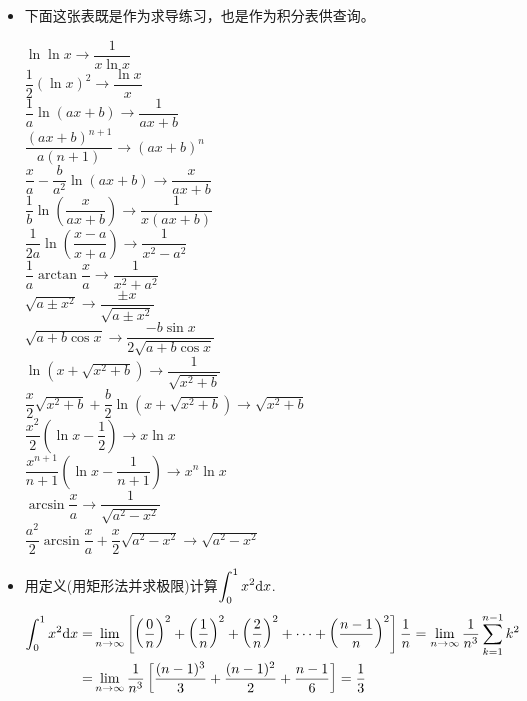 \begin{itemize}[leftmargin=\inteval{\myitemleftmargin}pt,itemsep=
   \inteval{\myitemitempsep}pt,topsep=\inteval{\myitemtopsep}pt]
\item 下面这张表既是作为求导练习，也是作为积分表供查询。
\vspace{-3mm}
\begin{multicols}{2}
\noindent $ \ln\ln x \to \dfrac{1}{x\ln x} $ \\ 
$ \dfrac{1}{2}(\ln x)^2\to \dfrac{\ln x}{x} $ \\
$ \dfrac{1}{a}\ln(ax+b)\to \dfrac{1}{ax+b} $ \\ 
$ \dfrac{(ax+b)^{n+1}}{a(n+1)} \to (ax+b)^n $ \\ 
$ \dfrac{x}{a}-\dfrac{b}{a^2}\ln(ax+b) \to \dfrac{x}{ax+b}  $ \\ 
$ \dfrac{1}{b}\ln \left( \dfrac{x}{ax+b}\right) \to \dfrac{1}{x(ax+b)}   $ \\ 
$ \dfrac{1}{2a}\ln \left(\dfrac{x-a}{x+a} \right)\to\dfrac{1}{x^2-a^2} $ \\ 
$ \dfrac{1}{a}\arctan\dfrac{x}{a}\to\dfrac{1}{x^2+a^2} $ \\ 
$ \sqrt{a\pm x^2} \to \dfrac{\pm x}{\sqrt{a\pm x^2}} $ \\ 
$ \sqrt{a+b\cos x}\to \dfrac{-b\sin x}{2\sqrt{a+b\cos x}} $ \\ 
$ \ln(x+\sqrt{x^2+b}) \to \dfrac{1}{\sqrt{x^2+b}}   $ \\ 
$ \dfrac{x}{2}\sqrt{x^2+b}+\dfrac{b}{2}\ln(x+\sqrt{x^2+b})\to\sqrt{x^2+b} $\\ 
$ \dfrac{x^2}{2}\left(\ln x-\dfrac{1}{2} \right) \to x\ln x $ \\ 
$ \dfrac{x^{n+1}}{n+1}\left(\ln x-\dfrac{1}{n+1} \right) \to x^n\ln x $ \\ 
$ \arcsin \dfrac{x}{a} \to \dfrac{1}{\sqrt{a^2-x^2}}  $ \\ 
$ \dfrac{a^2}{2}\arcsin\dfrac{x}{a}+\dfrac{x}{2}\sqrt{a^2-x^2} \to \sqrt{a^2-x^2} $    
\end{multicols}

\item 用定义(用矩形法并求极限)计算$ \displaystyle\int_{0}^{1}x^2\mathrm{d} x $.
\begin{align*}
    \int_{0}^{1}x^2\mathrm{d} x=&\lim_{n\to \infty}\left[\left(\dfrac{0}{n}\right)^2+
    \left(\dfrac{1}{n}\right)^2+\left(\dfrac{2}{n}\right)^2+
    \cdots+\left(\dfrac{n-1}{n}\right)^2\right]\dfrac{1}{n} 
    =\lim_{n\to \infty}\dfrac{1}{n^3}\sum_{k=1}^{n-1}k^2 \\
    =&\lim_{n\to \infty}\dfrac{1}{n^3}\left[ \dfrac{(n-1)^3}{3}+\dfrac{(n-1)^2}{2}
    +\dfrac{n-1}{6}\right] = \dfrac{1}{3}
\end{align*}


\end{itemize}
